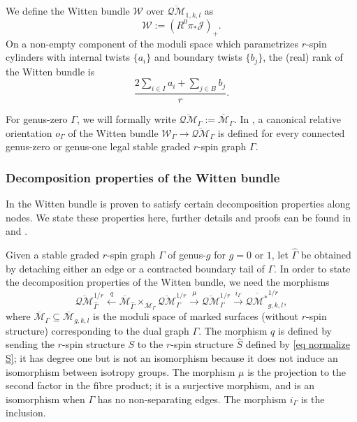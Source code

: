 \documentclass[11pt]{amsart}
\theoremstyle{definition}
\theoremstyle{remark}
\newcommand{\oQMb}{{\overline{\mathcal{QM}}}}
\newcommand{\<}{\left<}
\renewcommand{\>}{\right>}
\numberwithin{equation}{section}
\def\Mbar{{\overline{\mathcal M}}}
\begin{document}
We define the Witten  bundle  $\mathcal W$ over $\oQMb_{1,k,l}$ as 
$${\mathcal{W}}:= (R^0\pi_*\mathcal{J})_+.$$
On a non-empty component of the moduli space which parametrizes $r$-spin cylinders with internal twists $\{a_i\}$ and boundary twists $\{b_j\}$, the (real) rank of the Witten bundle is
\begin{equation}\label{eq rank of witten bundle g=1}\frac{2 \sum_{i\in I} a_i + \sum_{j\in B} b_j }{r}.\end{equation}



For genus-zero $\Gamma$, we will formally write $\oQMb_\Gamma:=\Mbar_{\Gamma}$. 
In \cite[\S 3.2]{TZ1}, a canonical relative orientation $o_\Gamma$ of the Witten bundle $\mathcal W_\Gamma \to \oQMb_\Gamma$ is defined for every connected genus-zero or genus-one legal stable graded $r$-spin graph $\Gamma$.





\subsubsection{Decomposition properties of the Witten bundle}\label{subsec decomp}
In \cite{BCT1,TZ1} the Witten bundle is proven to satisfy certain decomposition properties along nodes.  We state these %
properties here, further %
details and proofs can be found in \cite{TZ1} and \cite[\S 4.2]{BCT1}.



Given a stable graded $r$-spin graph $\Gamma$ of genus-$g$ for $g=0$ or $1$, let $\widehat{\Gamma}$ be obtained by detaching either an edge or a contracted boundary tail of $\Gamma$.  In order to state the decomposition properties of the Witten bundle, we need the morphisms
\begin{equation}
\label{eq Wittendecompsequence genus one}
\oQMb_{\widehat{\Gamma}}^{1/r} \xleftarrow{q} \Mbar_{\widehat{\Gamma}} \times_{\Mbar_{\Gamma}} \oQMb_{\Gamma}^{1/r} \xrightarrow{\mu} \oQMb_{\Gamma}^{1/r} \xrightarrow{i_{\Gamma}} \overline{\mathcal{QM}^*}_{g,k,l}^{1/r},
\end{equation}
where $\Mbar_{\Gamma} \subseteq \Mbar_{g,k,l}$ is the moduli space of marked surfaces (without $r$-spin structure) corresponding to the dual graph $\Gamma$.  The morphism $q$ is defined by sending the $r$-spin structure $S$ to the $r$-spin structure $\widehat{S}$ defined by \eqref{eq normalize S}; it has degree one but is not an isomorphism because it does not induce an isomorphism between isotropy groups.  The morphism $\mu$ is the projection to the second factor in the fibre product; it is a surjective morphism, and is an isomorphism when $\Gamma$ has no non-separating edges.  The morphism $i_{\Gamma}$ is the inclusion.
\end{document}
